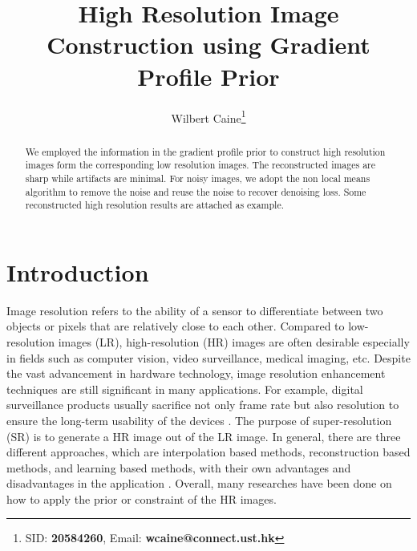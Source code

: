 \documentclass[a4paper,11pt]{article}
\title{High Resolution Image Construction using Gradient Profile Prior}
\author{
Wilbert Caine\thanks{SID: {\bf 20584260}, Email: {\bf wcaine@connect.ust.hk}}
}
\begin{document}
\thispagestyle{plain}
\maketitle


\begin{abstract}
We employed the information in the gradient profile prior to construct high resolution images form the corresponding low resolution images. The reconstructed images are sharp while artifacts are minimal. For noisy images, we adopt the non local means algorithm to remove the noise and reuse the noise to recover denoising loss. Some reconstructed high resolution results are attached as example.
\end{abstract}


\section{Introduction}

Image resolution refers to the ability of a sensor to differentiate between two objects or pixels that are relatively close to each other. Compared to low-resolution images (LR), high-resolution (HR) images are often desirable especially in fields such as computer vision, video surveillance, medical imaging, etc. Despite the vast advancement in hardware technology, image resolution enhancement techniques are still significant in many applications. For example, digital surveillance products usually sacrifice not only frame rate but also resolution to ensure the long-term usability of the devices \cite{in16}. The purpose of super-resolution (SR) is to generate a HR image out of the LR image. In general, there are three different approaches, which are interpolation based methods, reconstruction based methods, and learning based methods, with their own advantages and disadvantages in the application \cite{sr11}. Overall, many researches have been done on how to apply the prior or constraint of the HR images.
\end{document}
